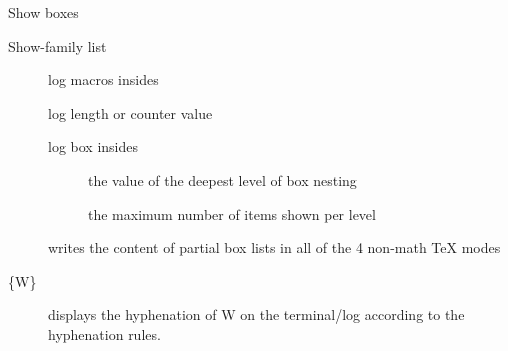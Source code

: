 \begin{frame}[fragile]{Show boxes\tW\magicPage}\relax

    
\end{frame}



\begin{frame}{Show-family list}\relax
    \small
    \begin{description}
        \item[\ccol{\show}] log macros insides
        \item[\ccol\showthe] log length or counter value
        \item[\ccol\showbox] log box insides 
        \begin{description}
            \item[\ccol\showboxdepth] the value of the deepest level of box nesting
            \item[\ccol\showboxbreadth] the maximum number of items shown per level 
        \end{description}
        \item[\ccol\showlists] writes the content of partial box lists in all of the 4 non-math TeX modes
        \item[\ccol\showhyphens\{W\}] displays the hyphenation of W on the terminal/log according to the hyphenation rules.
    \end{description}
\end{frame}

